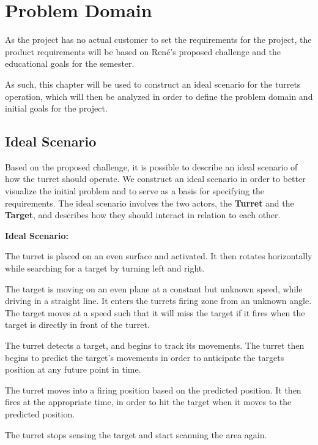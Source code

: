 \chapter{Problem Domain}\label{ProblemDomain}
As the project has no actual customer to set the requirements for the project,
the product requirements will be based on Ren\'e's proposed challenge and
the educational goals for the semester.\nl

As such, this chapter will be used to construct an ideal scenario for the
turrets operation, which will then be analyzed in order to define the problem
domain and initial goals for the project.

\section{Ideal Scenario}
Based on the proposed challenge, it is possible to describe an ideal scenario
of how the turret should operate. We construct an ideal scenario in order to better
visualize the initial problem and to serve as a basis for specifying the
requirements. The ideal scenario involves the two actors, the \textbf{Turret}
and the \textbf{Target}, and describes how they should interact in relation to
each other.

\begin{center}
\colorbox{diff}{
\begin{minipage}{0.8\linewidth}
\textbf{Ideal Scenario:}

The turret is placed on an even surface and activated. It then rotates
horizontally while searching for a target by turning left and right.\nl

The target is moving on an even plane at a constant but unknown speed, while
driving in a straight line. It enters the turrets firing zone from an
unknown angle. The target moves at a speed such that it will miss the target if
it fires when the target is directly in front of the turret.\nl

The turret detects a target, and begins to track its movements. The turret then
begins to predict the target's movements in order to anticipate the targets
position at any future point in time.\nl

The turret moves into a firing position based on the predicted position. It then
fires at the appropriate time, in order to hit the target when it moves to the
predicted position.\nl

The turret stops sensing the target and start scanning the area again.
\end{minipage}
}
\end{center}

